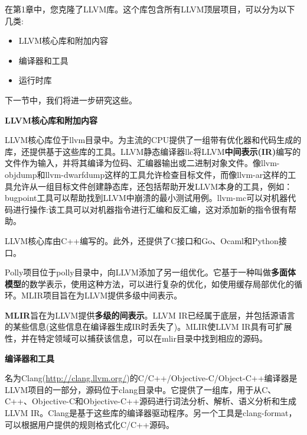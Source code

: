 在第1章中，您克隆了LLVM库。这个库包含所有LLVM顶层项目，可以分为以下几类:\par

\begin{itemize}
\item LLVM核心库和附加内容
\item 编译器和工具
\item 运行时库
\end{itemize}

下一节中，我们将进一步研究这些。\par

\hspace*{\fill} \par %
\textbf{LLVM核心库和附加内容}

LLVM核心库位于llvm目录中。为主流的CPU提供了一组带有优化器和代码生成的库，还提供基于这些库的工具。LLVM静态编译器llc将LLVM\textbf{中间表示(IR)}编写的文件作为输入，并将其编译为位码、汇编器输出或二进制对象文件。像llvm-objdump和llvm-dwarfdump这样的工具允许检查目标文件，而像llvm-ar这样的工具允许从一组目标文件创建静态库，还包括帮助开发LLVM本身的工具，例如：bugpoint工具可以帮助找到LLVM中崩溃的最小测试用例。llvm-mc可以对机器代码进行操作:该工具可以对机器指令进行汇编和反汇编，这对添加新的指令很有帮助。\par

LLVM核心库由C++编写的。此外，还提供了C接口和Go、Ocaml和Python接口。\par

Polly项目位于polly目录中，向LLVM添加了另一组优化。它基于一种叫做\textbf{多面体模型}的数学表示，使用这种方法，可以进行复杂的优化，如使用缓存局部优化的循环。MLIR项目旨在为LLVM提供多级中间表示。\par

\textbf{MLIR}旨在为LLVM提供\textbf{多级的间表示}。LLVM IR已经属于底层，并包括源语言的某些信息(这些信息在编译器生成IR时丢失了)。MLIR使LLVM IR具有可扩展性，并在特定领域可以捕获该信息，可以在mlir目录中找到相应的源码。\par

\hspace*{\fill} \par %
\textbf{编译器和工具}

名为Clang(\url{http://clang.llvm.org/})的C/C++/Objective-C/Object-C++编译器是LLVM项目的一部分，源码位于clang目录中。它提供了一组库，用于从C、C++、Objective-C和Objective-C++源码进行词法分析、解析、语义分析和生成LLVM IR。Clang是基于这些库的编译器驱动程序。另一个工具是clang-format，可以根据用户提供的规则格式化C/C++源码。\par

